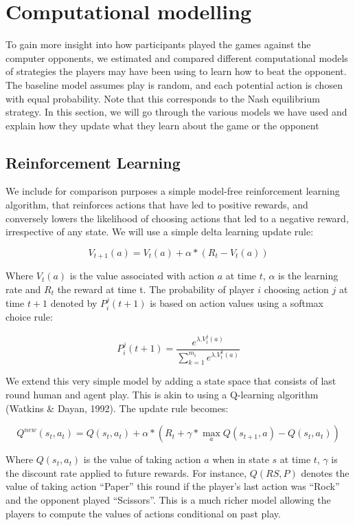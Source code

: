 \documentclass[man,floatsintext]{apa6}
\begin{document}
\newpage

\hypertarget{computational-modelling}{%
\section{Computational modelling}\label{computational-modelling}}

To gain more insight into how participants played the games against the computer opponents, we estimated and compared different computational models of strategies the players may have been using to learn how to beat the opponent. The baseline model assumes play is random, and each potential action is chosen with equal probability. Note that this corresponds to the Nash equilibrium strategy. In this section, we will go through the various models we have used and explain how they update what they learn about the game or the opponent

\hypertarget{reinforcement-learning}{%
\subsection{Reinforcement Learning}\label{reinforcement-learning}}

We include for comparison purposes a simple model-free reinforcement learning algorithm, that reinforces actions that have led to positive rewards, and conversely lowers the likelihood of choosing actions that led to a negative reward, irrespective of any state. We will use a simple delta learning update rule:

\[ V_{t+1}(a) = V_{t}(a) + \alpha*( R_{t}  - V_{t}(a)) \]

Where \(V_{t}(a)\) is the value associated with action \(a\) at time \(t\), \(\alpha\) is the learning rate and \(R_{t}\) the reward at time t. The probability of player \(i\) choosing action \(j\) at time \(t+1\) denoted by \(P_{i}^{j}(t+1)\) is based on action values using a softmax choice rule:

\[P_{i}^{j}(t+1) = \frac{e^{\lambda . V_{t}^{j}(a)}}{\sum_{k=1}^{m_{i}}e^{\lambda . V_{t}^{k}(a)}} \]

We extend this very simple model by adding a state space that consists of last round human and agent play. This is akin to using a Q-learning algorithm (Watkins \& Dayan, 1992). The update rule becomes:

\[ Q^{new}(s_{t},a_{t}) = Q(s_{t},a_{t}) + \alpha*( R_{t}  + \gamma*\underset{a}{\max}Q(s_{t+1},a) - Q(s_{t},a_{t}) ) \]

Where \(Q(s_{t},a_{t})\) is the value of taking action \(a\) when in state \(s\) at time \(t\), \(\gamma\) is the discount rate applied to future rewards. For instance, \(Q(RS,P)\) denotes the value of taking action \enquote{Paper} this round if the player's last action was \enquote{Rock} and the opponent played \enquote{Scissors}. This is a much richer model allowing the players to compute the values of actions conditional on past play.
\end{document}
